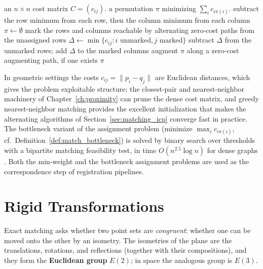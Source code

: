 \begin{algorithm}[htbp]
\caption{Hungarian Algorithm for the Assignment Problem}
\label{alg:match_hungarian}
\begin{algorithmic}[1]
\Require an $n \times n$ cost matrix $C = (c_{ij})$.
\Ensure a permutation $\pi$ minimizing $\sum_i c_{i\pi(i)}$.
  \State subtract the row minimum from each row, then the column minimum from each column
  \State $\pi \gets \emptyset$ 
    \State mark the rows and columns reachable by alternating zero-cost paths from the unassigned rows
    \State $\Delta \gets \min\{ c_{ij} : i \text{ unmarked}, j \text{ marked} \}$
    \State subtract $\Delta$ from the unmarked rows; add $\Delta$ to the marked columns
    \State augment $\pi$ along a zero-cost augmenting path, if one exists
  \EndWhile
  \State \Return $\pi$
\EndFunction
\end{algorithmic}
\end{algorithm}

In geometric settings the costs $c_{ij} = \|p_i - q_j\|$ are Euclidean
distances, which gives the problem exploitable structure: the closest-pair
and nearest-neighbor machinery of Chapter~\ref{ch:proximity} can prune the
dense cost matrix, and greedy nearest-neighbor matching provides the
excellent initialization that makes the alternating algorithms of
Section~\ref{sec:matching_icp} converge fast in practice. The bottleneck
variant of the assignment problem (minimize $\max_i c_{i\pi(i)}$, cf.\
Definition~\ref{def:match_bottleneck}) is solved by binary search over
thresholds with a bipartite matching feasibility test, in time
$O(n^{2.5} \log n)$ for dense graphs \cite{cormen2009}. Both the min-weight
and the bottleneck assignment problems are used as the correspondence
step of registration pipelines.


\section{Rigid Transformations}
\label{sec:matching_rigid}

Exact matching asks whether two point sets are
\emph{congruent}: whether one can be moved onto the other by an isometry.
The isometries of the plane are the translations, rotations, and reflections
(together with their compositions), and they form the \textbf{Euclidean
group} $E(2)$; in space the analogous group is $E(3)$.

